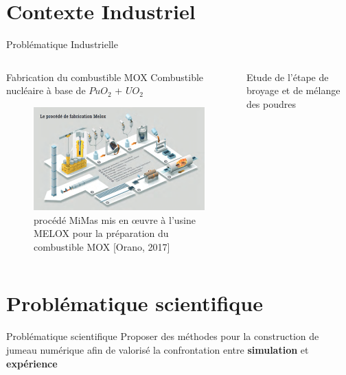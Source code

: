 \documentclass[aspectratio=169]{beamer} %
\begin{document}
\section{Contexte Industriel}
\begin{frame}{Problématique Industrielle}
    \begin{columns}
        \begin{column}{0.5\textwidth}
            \begin{block}{Fabrication du combustible MOX}
                Combustible nucléaire à base de $PuO_2$ + $UO_2$
                \begin{figure}
                    \includegraphics[width=\textwidth]{image/fuel_cycle.png}
                    \caption*{procédé MiMas mis en œuvre à l’usine MELOX pour la préparation du combustible MOX [Orano, 2017]}
                \end{figure}
            \end{block}
        \end{column}
        \begin{column}{0.5\textwidth}
            Etude de l'étape de broyage et de mélange des poudres

        \end{column}
    \end{columns}
\end{frame}

\section{Problématique scientifique}
\begin{frame}{Problématique scientifique}
    Proposer des méthodes pour la construction de jumeau numérique afin de valorisé la confrontation entre \textbf{simulation} et \textbf{expérience}
\end{frame}
\end{document}

